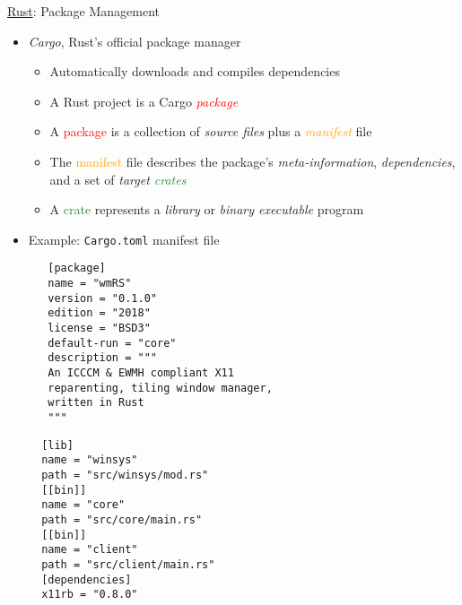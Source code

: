 \begin{frame}[c,fragile]{\underline{Rust}: Package Management \hfill {\footnotesize \currentname}}

    \begin{itemize}

        \item \textit{Cargo}, Rust's official package manager\\
            \begin{itemize}
                \item Automatically downloads and compiles dependencies
                \item A Rust project is a Cargo \textcolor{red}{\textit{package}}
                \item A \textcolor{red}{package} is a collection of \textit{source files} plus a \textcolor{orange}{\textit{manifest}} file
                \item The \textcolor{orange}{manifest} file describes the package's \textit{meta-information}, \textit{dependencies}, and a set of \textit{target \textcolor{ForestGreen}{crates}}
                \item A \textcolor{ForestGreen}{crate} represents a \textit{library} or \textit{binary executable} program
            \end{itemize}

        \item Example: \texttt{Cargo.toml} manifest file\\
\begin{minipage}{.55\linewidth}
\begin{verbatim}
   [package]
   name = "wmRS"
   version = "0.1.0"
   edition = "2018"
   license = "BSD3"
   default-run = "core"
   description = """
   An ICCCM & EWMH compliant X11
   reparenting, tiling window manager,
   written in Rust
   """
\end{verbatim}
\end{minipage}%
\begin{minipage}{.35\linewidth}
\begin{verbatim}
  [lib]
  name = "winsys"
  path = "src/winsys/mod.rs"
  [[bin]]
  name = "core"
  path = "src/core/main.rs"
  [[bin]]
  name = "client"
  path = "src/client/main.rs"
  [dependencies]
  x11rb = "0.8.0"
\end{verbatim}
\end{minipage}

    \end{itemize}

    \vfill

\end{frame}

